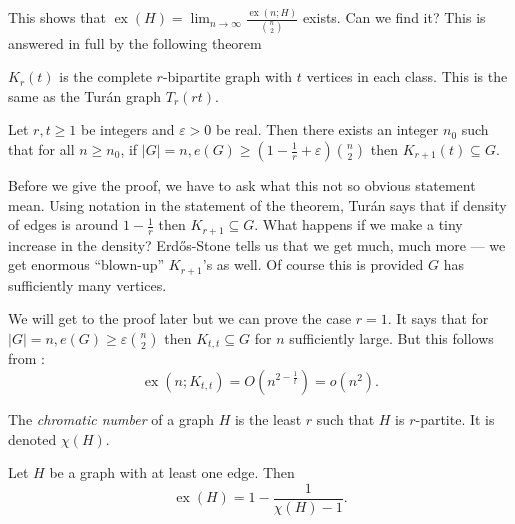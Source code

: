 \documentclass[a4paper]{article}
\DeclareMathOperator{\exx}{ex} %
\begin{document}
This shows that \(\exx(H) = \lim_{n \to \infty} \frac{\exx(n; H)}{\binom{n}{2}}\) exists. Can we find it? This is answered in full by the following theorem

\begin{notation}
  \(K_r(t)\) is the complete \(r\)-bipartite graph with \(t\) vertices in each class. This is the same as the Turán graph \(T_r(rt)\).
\end{notation}

\begin{theorem}
  Let \(r, t \geq 1\) be integers and \(\varepsilon > 0\) be real. Then there exists an integer \(n_0\) such that for all \(n \geq n_0\), if \(|G| = n, e(G) \geq (1 - \frac{1}{r} + \varepsilon) \binom{n}{2}\) then \(K_{r + 1}(t) \subseteq G\).
\end{theorem}

Before we give the proof, we have to ask what this not so obvious statement mean. Using notation in the statement of the theorem, Turán says that if density of edges is around \(1 - \frac{1}{r}\) then \(K_{r + 1} \subseteq G\). What happens if we make a tiny increase in the density? Erdős-Stone tells us that we get much, much more --- we get enormous ``blown-up'' \(K_{r + 1}\)'s as well. Of course this is provided \(G\) has sufficiently many vertices.

We will get to the proof later but we can prove the case \(r = 1\). It says that for \(|G| = n, e(G) \geq \varepsilon \binom{n}{2}\) then \(K_{t, t} \subseteq G\) for \(n\) sufficiently large. But this follows from :
\[
  \exx(n; K_{t, t}) = O(n^{2 - \frac{1}{t}}) = o(n^2).
\]

\begin{definition}
  The \emph{chromatic number} of a graph \(H\) is the least \(r\) such that \(H\) is \(r\)-partite. It is denoted \(\chi(H)\).
\end{definition}

\begin{corollary}
  \label{cor:forbidden subgraph and chromatic number}
  Let \(H\) be a graph with at least one edge. Then
  \[
    \exx(H) = 1 - \frac{1}{\chi(H) - 1}.
  \]
\end{corollary}
\end{document}
